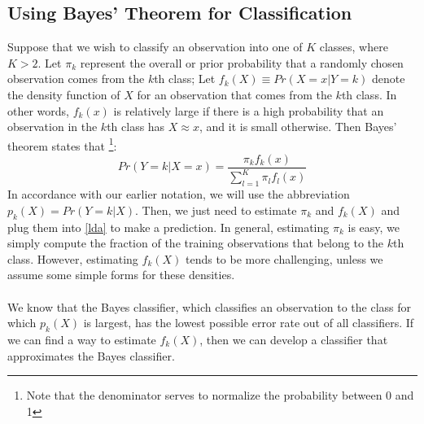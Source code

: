 \subsection{Using Bayes’ Theorem for Classification}
Suppose that we wish to classify an observation into one of $K$ classes, where $K > 2$. Let $\pi_k$ represent the overall or prior probability that a randomly chosen observation comes from the $k$th class; Let $f_k(X) \equiv Pr(X = x|Y = k)$ denote the density function of $X$ for an observation that comes from the $k$th class. In other words, $f_k(x)$ is relatively large if there is a high probability that an observation in the $k$th class has $X \approx x$, and it is small otherwise. Then Bayes’
theorem states that \footnote{Note that the denominator serves to normalize the probability between 0 and 1}:
\begin{equation}
    Pr(Y = k|X = x) = \frac{\pi_k f_k(x)}{\sum_{l=1}^K \pi_l f_l(x)}
    \label{lda}
\end{equation}
In accordance with our earlier notation, we will use the abbreviation $p_k(X)
= Pr(Y = k|X)$. Then, we just need to estimate $\pi_k$ and $f_k(X)$ and plug them into \ref{lda} to make a prediction. In general, estimating $\pi_k$ is easy,  we simply compute the fraction of the training observations that belong to the $k$th class. However, estimating $f_k(X)$ tends to be more challenging, unless we assume some simple forms for these densities.\\\\
We know that the Bayes classifier, which classifies an observation to the class for which $p_k(X)$ is largest, has the lowest possible error rate out of all classifiers. If we can find a way to estimate $f_k(X)$, then we can develop a classifier that approximates the Bayes classifier.

